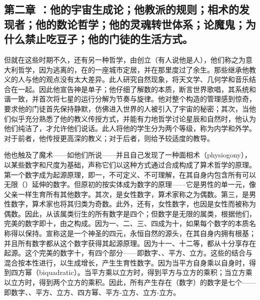 
\subsection{第二章 ：他的宇宙生成论；他教派的规则；相术的发现者；他的数论哲学；他的灵魂转世体系；论魔鬼；为什么禁止吃豆子；他的门徒的生活方式。}

但就在这些时期不久，还有另一种哲学，由创立（有人说他是人），他们称之为意大利哲学，因为逃离的，在的一座城市定居，并在那里度过了余生。那些继承他教义的人与他的观点没有太大差异。此人研究自然现象，将天文学、几何学和音乐结合在一起。因此他宣告神是单子；他仔细了解数的本质，断言世界歌唱，其系统和谐一致，并首次将七星的运行分解为节奏与旋律。他对整个构造的管理感到惊奇，要求他的门徒首先保持静默，仿佛进入世界的人被引入了宇宙的秘密；其次，当他们似乎充分熟悉了他的教义传授方式，并能有力地哲学讨论星辰和自然时，他认为他们纯洁了，才允许他们说话。此人将他的学生分为两个等级，称为内学和外学。对于前者，他传授更高深的教义；对于后者，则给予较适度的教导。\par

他也触及了魔术——如他们所说——并且自己发现了一种面相术（physiogony），以某些数字和尺度为基础，声称它们以这种方式通过合成构成了算术哲学的原理。第一个数字成为起源原理，即一，不可定义、不可理解，在其自身内包含所有可以无限（）延伸的数字。但原初的按实体成为数字的原理——它是男性的单一元，像父亲一样生育所有其他数字。其次，是女性数字，算术家称之为偶数。第三，是男性数字，算术家也将其归类为奇数。此外，还有，女性数字，也因是女性而被称为偶数。因此，从该属类衍生的所有数字是四个；但数字是无限的属类，根据他们，完美的数字即十，由之构成。因为一、二、三、四成为十，如果每个数字的本质名称得以保持。宣称这是一个神圣的四元，永恒自然的源头，在其自身内拥有根基；并且所有数字都从这个数字获得其起源原理。因为十一、十二等，都从十分享存在起源。这个完美的数字十，有四个部分——即数字、、平方、立方。这些的结合与混合按本性进行，以生成增长，产生生育性数字。因为当平方自身乘以自身时，得到四方幂（biquadratic）。当平方乘以立方时，得到平方与立方的乘积；当立方乘以立方时，得到两个立方的乘积。因此，所有产生存在（数字）的数字是七个——即数字、、平方、立方、四方幂、平方-立方、立方-立方。\par

